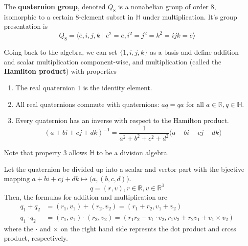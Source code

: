   \begin{definition}
    The \textbf{quaternion group}, denoted $Q_8$ is a nonabelian group of order $8$, isomorphic to a certain $8$-element subset in $\mathbb{H}$ under multiplication. It's group presentation is 
    \begin{equation}
      Q_8 = \big\langle \bar{e}, i, j, k \;|\; \bar{e}^2 = e, i^2 = j^2 = k^2 = ijk = \bar{e} \big\rangle
    \end{equation}
  \end{definition}

  Going back to the algebra, we can set $\{1, i, j, k\}$ as a basis and define addition and scalar multiplication component-wise, and multiplication (called the \textbf{Hamilton product}) with properties
  \begin{enumerate}
    \item The real quaternion $1$ is the identity element. 
    \item All real quaternions commute with quaternions: $a q = q a$ for all $a \in \mathbb{R}, q \in \mathbb{H}$. 
    \item Every quaternion has an inverse with respect to the Hamilton product. 
      \begin{equation}
        (a + bi + cj + dk)^{-1} = \frac{1}{a^2 + b^2 + c^2 + d^2} \big( a - bi - cj - dk\big)
      \end{equation}
  \end{enumerate}
  Note that property 3 allows $\mathbb{H}$ to be a division algebra. 

  \begin{theorem}
    Let the quaternion be divided up into a scalar and vector part with the bjective mapping $a + bi + cj + dk \mapsto \big(a, (b, c, d)\big)$. 
    \begin{equation}
      q = (r, v), r \in \mathbb{R}, v \in \mathbb{R}^3
    \end{equation}
    Then, the formulas for addition and multiplication are
    \begin{align*}
      q_1 + q_2 & = (r_1, v_1) + (r_2, v_2) = (r_1 + r_2, v_1 + v_2) \\
      q_1 \cdot q_2 & = (r_1, v_1) \cdot (r_2, v_2) = (r_1 r_2 - v_1 \cdot v_2, r_1 v_2 + r_2 v_1 + v_1 \times v_2)
    \end{align*}
    where the $\cdot$ and $\times$ on the right hand side represnts the dot product and cross product, respectively. 
  \end{theorem}

